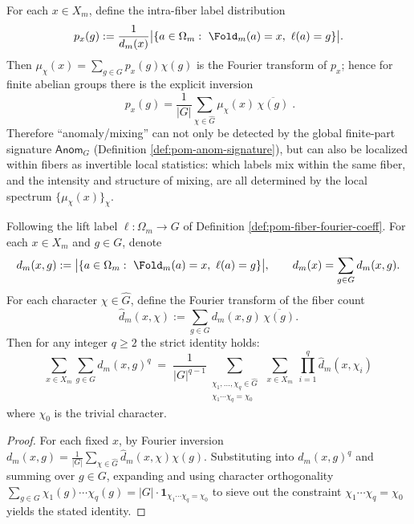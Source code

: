 \begin{corollary}\label{cor:pom-fiber-label-distribution-inversion}
For each \(x\in X_m\), define the intra-fiber label distribution
$$
p_x(g):=\frac{1}{d_m(x)}\bigl|\{a\in\Omega_m:\ \Fold_m(a)=x,\ \ell(a)=g\}\bigr|.
$$
Then \(\mu_\chi(x)=\sum_{g\in G}p_x(g)\chi(g)\) is the Fourier transform of \(p_x\); hence for finite abelian groups there is the explicit inversion
$$
\boxed{\;
p_x(g)=\frac{1}{|G|}\sum_{\chi\in\widehat G}\mu_\chi(x)\,\overline{\chi(g)}\; }.
$$
Therefore ``anomaly/mixing'' can not only be detected by the global finite-part signature \(\mathsf{Anom}_G\) (Definition \ref{def:pom-anom-signature}), but can also be localized within fibers as invertible local statistics: which labels mix within the same fiber, and the intensity and structure of mixing, are all determined by the local spectrum \(\{\mu_\chi(x)\}_{\chi}\).
\end{corollary}
\begin{proposition}\label{prop:pom-mom-lift-fourier-distribution}
Following the lift label \(\ell:\Omega_m\to G\) of Definition \ref{def:pom-fiber-fourier-coeff}.
For each \(x\in X_m\) and \(g\in G\), denote
\[
d_m(x,g):=\bigl|\{a\in\Omega_m:\ \Fold_m(a)=x,\ \ell(a)=g\}\bigr|,
\qquad
d_m(x)=\sum_{g\in G}d_m(x,g).
\]
For each character \(\chi\in\widehat G\), define the Fourier transform of the fiber count
\[
\widehat d_m(x,\chi):=\sum_{g\in G} d_m(x,g)\,\overline{\chi(g)}.
\]
Then for any integer \(q\ge 2\) the strict identity holds:
\[
\boxed{\;
\sum_{x\in X_m}\sum_{g\in G} d_m(x,g)^q
\;=\;
\frac{1}{|G|^{q-1}}
\sum_{\substack{\chi_1,\dots,\chi_q\in\widehat G\\ \chi_1\cdots\chi_q=\chi_0}}
\ \sum_{x\in X_m}\ \prod_{i=1}^q \widehat d_m(x,\chi_i)\;}
\]
where \(\chi_0\) is the trivial character.
\end{proposition}
\begin{proof}
For each fixed \(x\), by Fourier inversion
\(
d_m(x,g)=\frac{1}{|G|}\sum_{\chi\in\widehat G}\widehat d_m(x,\chi)\chi(g)
\).
Substituting into \(d_m(x,g)^q\) and summing over \(g\in G\), expanding and using character orthogonality
\(
\sum_{g\in G}\chi_1(g)\cdots\chi_q(g)
=|G|\cdot \mathbf{1}_{\chi_1\cdots\chi_q=\chi_0}
\)
to sieve out the constraint \(\chi_1\cdots\chi_q=\chi_0\) yields the stated identity.
\end{proof}
